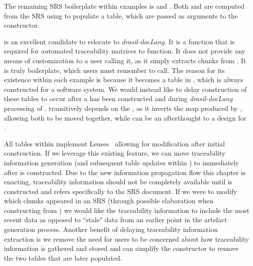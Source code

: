 The remaining SRS boilerplate within examples is  and . Both  and  are computed from the SRS using  to populate a table, which are passed as arguments to the  constructor.

 is an excellent candidate to relocate to \textit{drasil-docLang}. It is a function that is required for automated traceability matrices to function. It does not provide any means of customization to a user calling it, as it simply extracts chunks from . It is truly boilerplate, which users must remember to call. The reason for its existence within each example is because it becomes a table in , which is always constructed for a software system. We would instead like to delay construction of these tables to occur after a  has been constructed and during \textit{drasil-docLang} processing of .  transitively depends on the , as it inverts the map produced by , allowing both to be moved together, while  can be an afterthought to a design for .

All tables within  implement Lenses~\cite{Lenses} allowing for modification after initial construction. If we leverage this existing feature, we can move traceability information generation (and subsequent table updates within ) to immediately after  is constructed. Due to the new information propagation flow this chapter is enacting, traceability information should not be completely available until  is constructed and refers specifically to the SRS document. If we were to modify which chunks appeared in an SRS (through possible elaboration when constructing  from ) we would like the traceability information to include the most recent data as opposed to ``stale" data from an earlier point in the artefact generation process. Another benefit of delaying traceability information extraction is we remove the need for users to be concerned about how traceability information is gathered and stored and can simplify the  constructor to remove the two tables that are later populated.

